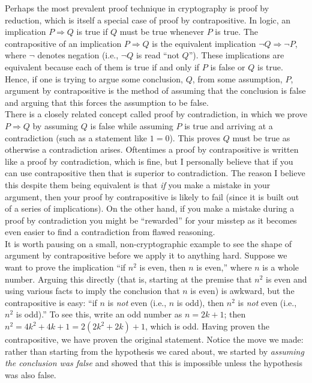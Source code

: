 \documentclass[12pt]{article}
\theoremstyle{definition}
\theoremstyle{remark}
\theoremstyle{definition}
\begin{document}
Perhaps the most prevalent proof technique in cryptography is proof by reduction, which is itself a special case of proof by contrapositive. In logic, an implication $P\Rightarrow Q$ is true if $Q$ must be true whenever $P$ is true. The contrapositive of an implication $P\Rightarrow Q$ is the equivalent implication $\neg Q\Rightarrow \neg P$, where $\neg$ denotes negation (i.e., $\neg Q$ is read ``not $Q$''). These implications are equivalent because each of them is true if and only if $P$ is false or $Q$ is true. Hence, if one is trying to argue some conclusion, $Q$, from some assumption, $P$, argument by contrapositive is the method of assuming that the conclusion is false and arguing that this forces the assumption to be false.\\

There is a closely related concept called proof by contradiction, in which we prove $P\Rightarrow Q$ by assuming $Q$ is false while assuming $P$ is true and arriving at a contradiction (such as a statement like $1=0$). This proves $Q$ must be true as otherwise a contradiction arises. Oftentimes a proof by contrapositive is written like a proof by contradiction, which is fine, but I personally believe that if you can use contrapositive then that is superior to contradiction. The reason I believe this despite them being equivalent is that \emph{if} you make a mistake in your argument, then your proof by contrapositive is likely to fail (since it is built out of a series of implications). On the other hand, if you make a mistake during a proof by contradiction you might be ``rewarded'' for your misstep as it becomes even easier to find a contradiction from flawed reasoning.\\

It is worth pausing on a small, non-cryptographic example to see the shape of argument by contrapositive before we apply it to anything hard. Suppose we want to prove the implication ``if $n^2$ is even, then $n$ is even,'' where $n$ is a whole number. Arguing this directly (that is, starting at the premise that $n^2$ is even and using various facts to imply the conclusion that $n$ is even) is awkward, but the contrapositive is easy: ``if $n$ is \emph{not} even (i.e., $n$ is odd), then $n^2$ is \emph{not} even (i.e., $n^2$ is odd).'' To see this, write an odd number as $n = 2k+1$; then $n^2 = 4k^2 + 4k + 1 = 2(2k^2 + 2k) + 1$, which is odd. Having proven the contrapositive, we have proven the original statement. Notice the move we made: rather than starting from the hypothesis we cared about, we started by \emph{assuming the conclusion was false} and showed that this is impossible unless the hypothesis was also false.
\end{document}
